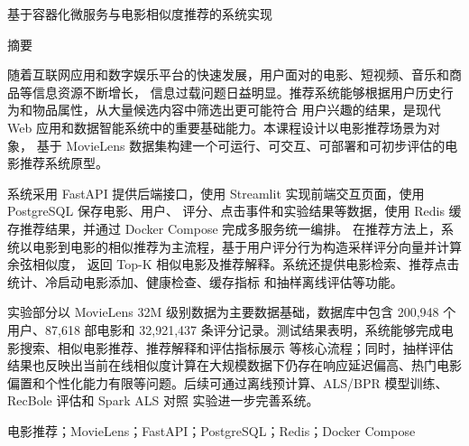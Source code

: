 \pagestyle{plain}

\newpage
\begin{center}
{\heitib \sanhao 基于容器化微服务与电影相似度推荐的系统实现}

\vspace{24pt}
{\heitib \sihao 摘要}
\end{center}


{\song \xiaosihao
\setlength{\baselineskip}{20pt}

随着互联网应用和数字娱乐平台的快速发展，用户面对的电影、短视频、音乐和商品等信息资源不断增长，
信息过载问题日益明显。推荐系统能够根据用户历史行为和物品属性，从大量候选内容中筛选出更可能符合
用户兴趣的结果，是现代 Web 应用和数据智能系统中的重要基础能力。本课程设计以电影推荐场景为对象，
基于 MovieLens 数据集构建一个可运行、可交互、可部署和可初步评估的电影推荐系统原型。

系统采用 FastAPI 提供后端接口，使用 Streamlit 实现前端交互页面，使用 PostgreSQL 保存电影、用户、
评分、点击事件和实验结果等数据，使用 Redis 缓存推荐结果，并通过 Docker Compose 完成多服务统一编排。
在推荐方法上，系统以电影到电影的相似推荐为主流程，基于用户评分行为构造采样评分向量并计算余弦相似度，
返回 Top-K 相似电影及推荐解释。系统还提供电影检索、推荐点击统计、冷启动电影添加、健康检查、缓存指标
和抽样离线评估等功能。

实验部分以 MovieLens 32M 级别数据为主要数据基础，数据库中包含 200{,}948 个用户、87{,}618 部电影和
32{,}921{,}437 条评分记录。测试结果表明，系统能够完成电影搜索、相似电影推荐、推荐解释和评估指标展示
等核心流程；同时，抽样评估结果也反映出当前在线相似度计算在大规模数据下仍存在响应延迟偏高、热门电影
偏置和个性化能力有限等问题。后续可通过离线预计算、ALS/BPR 模型训练、RecBole 评估和 Spark ALS 对照
实验进一步完善系统。

\vspace{12pt}
 电影推荐；MovieLens；FastAPI；PostgreSQL；Redis；Docker Compose
}

\newpage
